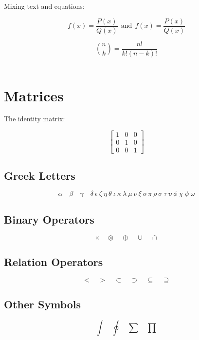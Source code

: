 \documentclass[]{article}
\begin{document}
Mixing text and equations:

\[ f(x)=\frac{P(x)}{Q(x)} \ \ \textrm{and} 
\ \ f(x)=\textstyle\frac{P(x)}{Q(x)} \]


\[
\binom{n}{k} = \frac{n!}{k!(n-k)!}
\]\\

\section{Matrices}

The identity matrix:

\[
\left[
\begin{matrix}
	1 & 0 & 0 \\
	0 & 1 & 0 \\
	0 & 0 & 1
\end{matrix}
\right]
\]

\subsection{Greek Letters}
\newcommand\omicron{o}
 
$$ \alpha \quad \beta \quad  \gamma \quad \delta \  \epsilon \   \zeta \  \eta \  \theta \  \iota \  \kappa \  \lambda \  \mu \  \nu  \  \xi \  
\omicron \ \pi \  \rho \  \sigma \  \tau \  \upsilon \   \phi \  \chi \  \psi \  \omega $$


\subsection{Binary Operators}

$$ \times \quad \otimes \quad \oplus \quad \cup \quad \cap $$

\subsection{Relation Operators}

$$ < \quad > \quad \subset \quad \supset \quad \subseteq \quad \supseteq $$

\subsection{Other Symbols}

$$ \int \quad \oint \quad \sum \quad \prod $$
\end{document}
